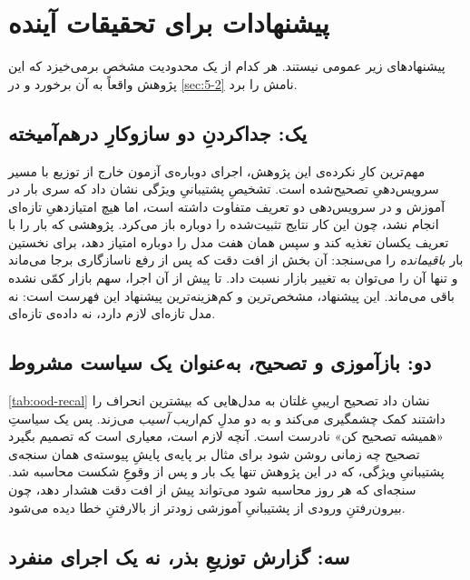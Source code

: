
\section{پیشنهادات برای تحقیقات آینده}
\label{sec:5-4}

پیشنهادهای زیر عمومی نیستند. هر کدام از یک محدودیت مشخص برمی‌خیزد که این پژوهش
واقعاً به آن برخورد و در \cref{sec:5-2} نامش را برد.

\subsection*{یک: جداکردنِ دو سازوکارِ درهم‌آمیخته}

مهم‌ترین کارِ نکرده‌ی این پژوهش، اجرای دوباره‌ی آزمون خارج از توزیع با مسیر
سرویس‌دهیِ تصحیح‌شده است. تشخیصِ پشتیبانیِ ویژگی نشان داد که سری بار در آموزش و
در سرویس‌دهی دو تعریف متفاوت داشته است، اما هیچ امتیازدهیِ تازه‌ای انجام نشد،
چون این کار نتایج تثبیت‌شده را دوباره باز می‌کرد. پژوهشی که بار را با تعریف
یکسان تغذیه کند و سپس همان هفت مدل را دوباره امتیاز دهد، برای نخستین بار
\emph{باقیمانده} را می‌سنجد: آن بخش از افت دقت که پس از رفع ناسازگاری برجا
می‌ماند و تنها آن را می‌توان به تغییر بازار نسبت داد. تا پیش از آن اجرا، سهم
بازار کمّی نشده باقی می‌ماند. این پیشنهاد، مشخص‌ترین و کم‌هزینه‌ترین پیشنهاد این
فهرست است: نه مدل تازه‌ای لازم دارد، نه داده‌ی تازه‌ای.

\subsection*{دو: بازآموزی و تصحیح، به‌عنوان یک سیاست مشروط}

\cref{tab:ood-recal} نشان داد تصحیح اریبیِ غلتان به مدل‌هایی که بیشترین انحراف
را داشتند کمک چشمگیری می‌کند و به دو مدلِ کم‌اریب \emph{آسیب} می‌زند. پس یک
سیاستِ «همیشه تصحیح کن» نادرست است. آنچه لازم است، معیاری است که تصمیم بگیرد
تصحیح چه زمانی روشن شود  برای مثال بر پایه‌ی پایشِ پیوسته‌ی همان سنجه‌ی
پشتیبانیِ ویژگی، که در این پژوهش تنها یک بار و پس از وقوعِ شکست محاسبه شد.
سنجه‌ای که هر روز محاسبه شود می‌تواند پیش از افت دقت هشدار دهد، چون
بیرون‌رفتنِ ورودی از پشتیبانیِ آموزشی زودتر از بالارفتنِ خطا دیده می‌شود.

\subsection*{سه: گزارش توزیعِ بذر، نه یک اجرای منفرد}


